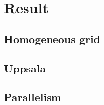 \section{Result}
\label{sec:result}

\subsection{Homogeneous grid}

\subsection{Uppsala}

\subsection{Parallelism}
